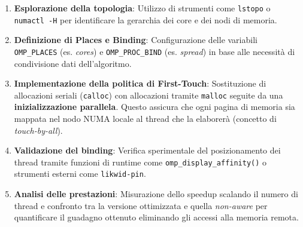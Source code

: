\begin{enumerate}
    \item \textbf{Esplorazione della topologia}: Utilizzo di strumenti come \texttt{lstopo} o \texttt{numactl -H} per identificare la gerarchia dei core e dei nodi di memoria.
    \item \textbf{Definizione di Places e Binding}: Configurazione delle variabili \texttt{OMP\_PLACES} (es. \textit{cores}) e \texttt{OMP\_PROC\_BIND} (es. \textit{spread}) in base alle necessità di condivisione dati dell'algoritmo.
    \item \textbf{Implementazione della politica di First-Touch}: Sostituzione di allocazioni seriali (\texttt{calloc}) con allocazioni tramite \texttt{malloc} seguite da una \textbf{inizializzazione parallela}. Questo assicura che ogni pagina di memoria sia mappata nel nodo NUMA locale al thread che la elaborerà (concetto di \textit{touch-by-all}).
    \item \textbf{Validazione del binding}: Verifica sperimentale del posizionamento dei thread tramite funzioni di runtime come \texttt{omp\_display\_affinity()} o strumenti esterni come \texttt{likwid-pin}.
    \item \textbf{Analisi delle prestazioni}: Misurazione dello speedup scalando il numero di thread e confronto tra la versione ottimizzata e quella \textit{non-aware} per quantificare il guadagno ottenuto eliminando gli accessi alla memoria remota.
\end{enumerate}